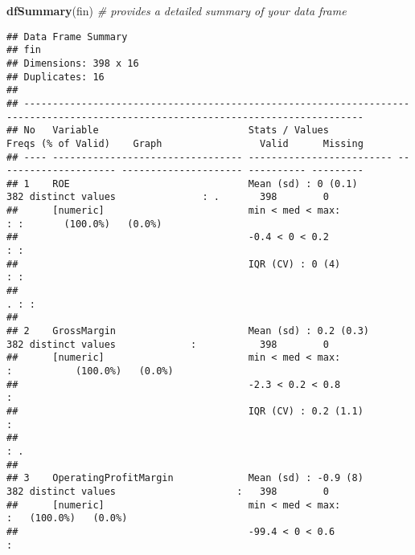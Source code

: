\documentclass[
]{article}
\newenvironment{Shaded}{\begin{snugshade}}{\end{snugshade}}
\newcommand{\CommentTok}[1]{\textcolor[rgb]{0.56,0.35,0.01}{\textit{#1}}}
\newcommand{\FunctionTok}[1]{\textcolor[rgb]{0.13,0.29,0.53}{\textbf{#1}}}
\newcommand{\NormalTok}[1]{#1}
\begin{document}
\begin{Shaded}
\begin{Highlighting}[]
\FunctionTok{dfSummary}\NormalTok{(fin) }\CommentTok{\# provides a detailed summary of your data frame}
\end{Highlighting}
\end{Shaded}

\begin{verbatim}
## Data Frame Summary  
## fin  
## Dimensions: 398 x 16  
## Duplicates: 16  
## 
## ---------------------------------------------------------------------------------------------------------------------------------
## No   Variable                          Stats / Values            Freqs (% of Valid)    Graph                 Valid      Missing  
## ---- --------------------------------- ------------------------- --------------------- --------------------- ---------- ---------
## 1    ROE                               Mean (sd) : 0 (0.1)       382 distinct values               : .       398        0        
##      [numeric]                         min < med < max:                                            : :       (100.0%)   (0.0%)   
##                                        -0.4 < 0 < 0.2                                              : :                           
##                                        IQR (CV) : 0 (4)                                            : :                           
##                                                                                                  . : :                           
## 
## 2    GrossMargin                       Mean (sd) : 0.2 (0.3)     382 distinct values             :           398        0        
##      [numeric]                         min < med < max:                                          :           (100.0%)   (0.0%)   
##                                        -2.3 < 0.2 < 0.8                                          :                               
##                                        IQR (CV) : 0.2 (1.1)                                      :                               
##                                                                                                  : .                             
## 
## 3    OperatingProfitMargin             Mean (sd) : -0.9 (8)      382 distinct values                     :   398        0        
##      [numeric]                         min < med < max:                                                  :   (100.0%)   (0.0%)   
##                                        -99.4 < 0 < 0.6                                                   :                       

\end{verbatim}
\end{document}
